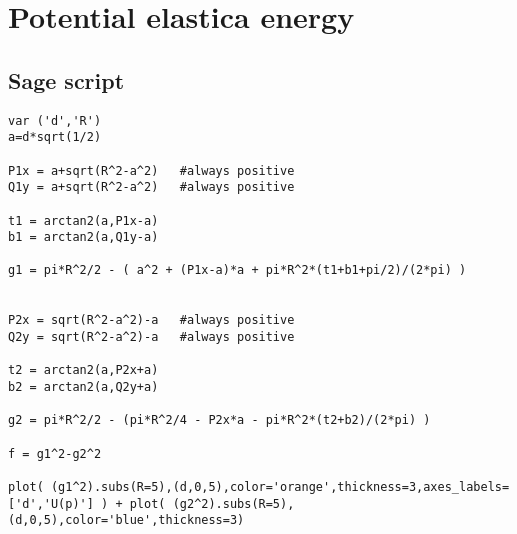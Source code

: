 \chapter{Potential elastica energy}
\label{chapter:appendix-potential-elastica-energy}

\section{Sage script}

\begin{lstlisting}
var ('d','R')
a=d*sqrt(1/2)

P1x = a+sqrt(R^2-a^2)	#always positive
Q1y = a+sqrt(R^2-a^2)	#always positive

t1 = arctan2(a,P1x-a)
b1 = arctan2(a,Q1y-a)

g1 = pi*R^2/2 - ( a^2 + (P1x-a)*a + pi*R^2*(t1+b1+pi/2)/(2*pi) )


P2x = sqrt(R^2-a^2)-a	#always positive
Q2y = sqrt(R^2-a^2)-a	#always positive

t2 = arctan2(a,P2x+a)
b2 = arctan2(a,Q2y+a)

g2 = pi*R^2/2 - (pi*R^2/4 - P2x*a - pi*R^2*(t2+b2)/(2*pi) )

f = g1^2-g2^2

plot( (g1^2).subs(R=5),(d,0,5),color='orange',thickness=3,axes_labels=['d','U(p)'] ) + plot( (g2^2).subs(R=5),(d,0,5),color='blue',thickness=3)
\end{lstlisting}